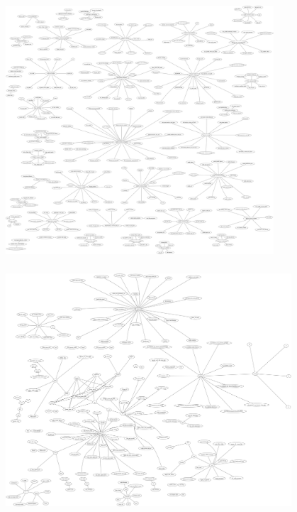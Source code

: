 \documentclass[usenames,dvipsnames, 18pt, compress, aspectratio=169]{beamer}
\begin{document}
\begin{frame}
    \frametitle{}
    \begin{center}

        \includegraphics[width=0.75\textwidth,center,clip=true,trim=30cm 30cm 30cm 30cm]{pg_options.jpg}

    \end{center}
\end{frame}

\begin{frame}
    \frametitle{}
    \begin{center}

        \includegraphics[width=0.8\textwidth,center,clip=true,trim=20cm 20cm 20cm 10cm]{sysctl_small.png}

    \end{center}
\end{frame}
\end{document}
